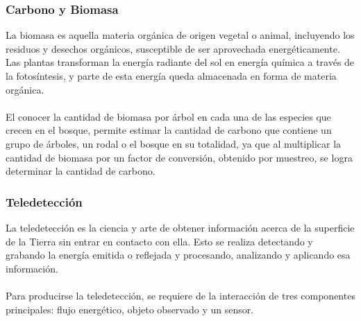 \documentclass[xcolor=table]{beamer}
\begin{document}
\begin{frame}\frametitle{Carbono y Biomasa}

La biomasa es aquella materia org\'anica de origen vegetal o animal, incluyendo los residuos y desechos org\'anicos, susceptible de ser aprovechada energ\'eticamente. Las plantas transforman la energ\'ia radiante del sol en energ\'ia qu\'imica a trav\'es de la fotos\'intesis, y parte de esta energ\'ia queda almacenada en forma de materia org\'anica.\\~\\
El conocer la cantidad de biomasa por \'arbol en cada una de las especies que crecen en el bosque, permite estimar la cantidad de carbono que contiene un grupo de \'arboles, un rodal o el bosque en su totalidad, ya que al multiplicar la cantidad de biomasa por un factor de conversi\'on, obtenido por muestreo, se logra determinar la cantidad de carbono.

\end{frame}
\begin{frame}\frametitle{Teledetecci\'on}

		La teledetecci\'on es la ciencia y arte de obtener informaci\'on acerca de la superficie de la Tierra sin entrar en contacto con ella. Esto se realiza detectando y grabando la energ\'ia emitida o reflejada y procesando, analizando y aplicando esa informaci\'on.\\~\\
		Para producirse la teledetecci\'on, se requiere de la interacci\'on de tres componentes principales: flujo energ\'etico, objeto observado y un sensor.

\end{frame}
\end{document}
